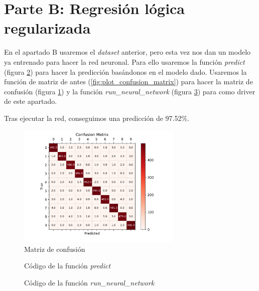 \documentclass[6pt]{../../shared/AiTex}
\begin{document}
\section{Parte B: Regresión lógica regularizada}

En el apartado B usaremos el \textit{dataset} anterior, pero esta vez nos dan un modelo ya entrenado para hacer la red neuronal. Para ello usaremos la función \textit{predict} (figura \ref{fig:predict}) para hacer la predicción basándonos en el modelo dado. Usaremos la función de matriz de antes (\ref{fig:plot_confusion_matrix}) para hacer la matriz de confusión (figura \ref{fig:matrix_b}) y la función \textit{run\_neural\_network} (figura \ref{fig:run_neural_network}) para como driver de este apartado.

Tras ejecutar la red, conseguimos una predicción de 97.52\%.

\begin{figure}[H]
    \centering
    \includegraphics[width=0.7\textwidth]{./imagenes/confusion_matrix_nn.png}
    \caption{Matriz de confusión}
    \label{fig:matrix_b}
\end{figure}

\begin{figure}[H]
    \centering
    
    \caption{Código de la función \textit{predict}}
    \label{fig:predict}
\end{figure}

\begin{figure}[H]
    \centering
    
    \caption{Código de la función \textit{run\_neural\_network}}
    \label{fig:run_neural_network}
\end{figure}
\end{document}
